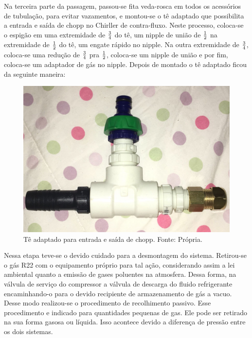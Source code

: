                         Na terceira parte da passagem, passou-se fita veda-rosca em todos os acessórios de
                        tubulação, para evitar vazamentos, e montou-se o tê adaptado que possibilita a
                        entrada e saída de chopp no Chirller de contra-fluxo. Neste processo,
                        coloca-se o espigão em uma extremidade de $3 \over 4$ do tê, um nipple de união
                        de $1 \over 2$ na extremidade de $1 \over 2$ do tê, um engate rápido no nipple. Na outra
                        extremidade de $3 \over 4$, coloca-se uma redução de $3 \over 4$ pra $1 \over 2$, coloca-se
                        um nipple de união e por fim, coloca-se um adaptador de gás no nipple. Depois
                        de montado o tê adaptado ficou da seguinte maneira:

                        \begin{figure}[!htb]
                            \centering
                            \includegraphics[scale= 0.3]{figuras/entrada-saida-chopp.png}
                            \caption{Tê adaptado para entrada e saída de chopp. Fonte: Própria.}
                            \label{entrada-saida-chopp}
                        \end{figure}

                        Nessa etapa teve-se o devido cuidado para a desmontagem do sistema. Retirou-se o gás
                        R22 com o equipamento próprio para tal ação, considerando assim a lei ambiental
                        quanto a emissão de gases poluentes na atmosfera. Dessa forma, na válvula
                        de serviço do compressor a válvula de descarga do fluido refrigerante
                        encaminhando-o para o devido recipiente de armazenamento de gás a vacuo.
                        Desse modo realizou-se o procedimento de recolhimento passivo. Esse procedimento e
                        indicado para quantidades pequenas de gas. Ele pode ser retirado na sua forma gasosa
                        ou líquida. Isso acontece devido a diferença de pressão entre os dois sistemas.

